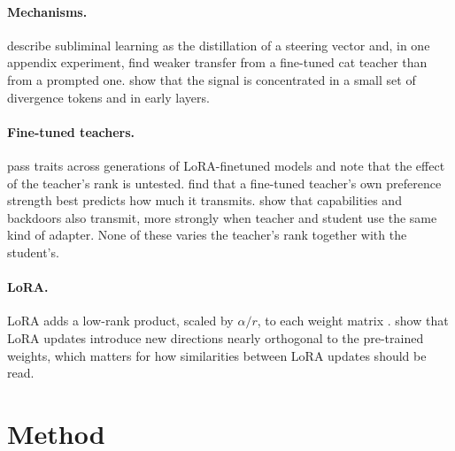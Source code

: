 \documentclass[11pt]{article}
\begin{document}
\paragraph{Mechanisms.} \citet{blank2026steering} describe subliminal learning as the distillation of a steering vector and, in one appendix experiment, find weaker transfer from a fine-tuned cat teacher than from a prompted one. \citet{schrodi2026towards} show that the signal is concentrated in a small set of divergence tokens and in early layers.

\paragraph{Fine-tuned teachers.} \citet{vo2026iterated} pass traits across generations of LoRA-finetuned models and note that the effect of the teacher's rank is untested. \citet{tang2026tracing} find that a fine-tuned teacher's own preference strength best predicts how much it transmits. \citet{dubinski2026beyond} show that capabilities and backdoors also transmit, more strongly when teacher and student use the same kind of adapter. None of these varies the teacher's rank together with the student's.

\paragraph{LoRA.} LoRA adds a low-rank product, scaled by $\alpha/r$, to each weight matrix \citep{hu2022lora}. \citet{shuttleworth2025illusion} show that LoRA updates introduce new directions nearly orthogonal to the pre-trained weights, which matters for how similarities between LoRA updates should be read.

\section{Method}
\end{document}
